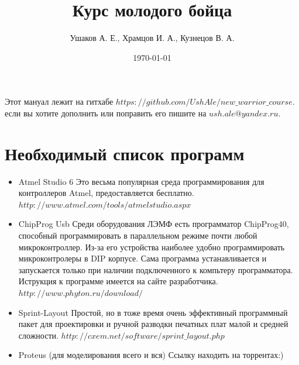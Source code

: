\documentclass[12pt]{article}
\title{Курс молодого бойца}
\author{Ушаков А. Е., Храмцов И. А., Кузнецов В. А.}
\date{\today}
\begin{document}
\maketitle


\newpage
\tableofcontents
\newpage

Этот мануал лежит на гитхабе $https://github.com/UshAle/new\_warrior\_course$.
если вы хотите дополнить или поправить его пишите на $ush.ale@yandex.ru$.
\section{Необходимый список программ}
\begin{itemize}
\item Atmel Studio 6
\newline Это весьма популярная среда программирования для контроллеров Atmel, предоставляется бесплатно.
\newline $http://www.atmel.com/tools/atmelstudio.aspx$
\item ChipProg Usb
\newline Среди оборудования ЛЭМФ есть программатор ChipProg40, способный программировать в параллельном режиме почти любой микроконтроллер.
Из-за его устройства наиболее удобно программировать микроконтролеры в DIP корпусе.
Сама программа устанавливается и запускается только при наличии подключенного к компьтеру программатора.
Иструкция к программе имеется на сайте разработчика.
\newline $http://www.phyton.ru/download/$
\item Sprint-Layout
\newline Простой, но в тоже время очень эффективный программный пакет для проектировки и ручной разводки печатных плат малой и средней сложности.
\newline $http://cxem.net/software/sprint\_layout.php$
\item Proteus (для моделирования всего и вся) Ссылку находить на торрентах:)
\end{itemize}
\end{document}
